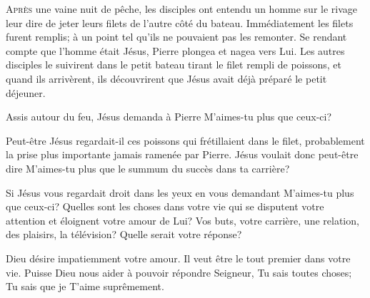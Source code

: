 



\lettrine{A}{près} une vaine nuit de pêche,
 les disciples ont entendu un homme sur le rivage
 leur dire de jeter leurs filets
 de l'autre côté du bateau. Immédiatement les filets furent remplis;
 à un point tel qu'ils ne pouvaient pas les remonter.
 Se rendant compte que l'homme était Jésus, Pierre plongea et nagea vers Lui.
 Les autres disciples le suivirent dans le petit bateau
 tirant le filet rempli de poissons, et quand ils arrivèrent,
 ils découvrirent que Jésus avait déjà préparé le petit déjeuner.

Assis autour du feu, Jésus demanda à Pierre\frcolon{} 
 \Og M'aimes-tu plus que ceux-ci? \Fg{}


Peut-être Jésus regardait-il ces poissons qui frétillaient dans le filet,
 probablement la prise plus importante jamais ramenée par Pierre.
 Jésus voulait donc peut-être dire\frcolon{} 
 \Og M'aimes-tu plus que le summum du succès dans ta carrière? \Fg{}

Si Jésus vous regardait droit dans les yeux en vous demandant\frcolon{}
 \Og M'aimes-tu plus que ceux-ci? \Fg{} 
 Quelles sont les choses dans votre vie qui se disputent votre attention
 et éloignent votre amour de Lui? Vos buts, votre carrière, une relation,
 des plaisirs, la télévision? Quelle serait votre réponse?

Dieu désire impatiemment votre amour. Il veut être le tout premier
 dans votre vie. Puisse Dieu nous aider à pouvoir répondre\frcolon{} 
 \Og Seigneur, Tu sais toutes choses; Tu sais que je T'aime suprêmement. \Fg{}

\dvrule




